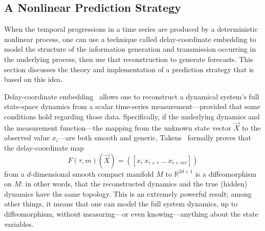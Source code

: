 \subsection{A Nonlinear Prediction Strategy}
\label{sec:lma}

When the temporal progressions in a time series are produced by a
deterministic nonlinear process, one can use a technique called
delay-coordinate embedding
%
%
to model the structure of the information generation and transmission
occurring in the underlying process, then use that reconstruction to
generate forecasts.  This section discusses the theory and
implementation of a prediction strategy that is based on this idea.

Delay-coordinate embedding~\cite{packard80,Sauer:1991lr,Takens:1981uq}
allows one to reconstruct a dynamical system's full state-space
dynamics from a scalar time-series measurement---provided that some
conditions hold regarding those data.  Specifically, if the underlying
dynamics and the measurement function---the mapping from the unknown
state vector $\vec{X}$ to the observed value $x_i$---are both smooth
and generic, Takens~\cite{Takens:1981uq} formally proves that the
delay-coordinate map
\[
F(\tau,m)(\vec{X}) = ([x_{i} ~ x_{i+\tau} ~ \dots ~x_{i+m\tau}])
\]
from a $d$-dimensional smooth compact manifold $M$ to
$\mathbb{R}^{2d+1}$ is a diffeomorphism on $M$: in other words, that
the reconstructed dynamics and the true (hidden) dynamics have the
same topology.  This is an extremely powerful result; among other
things, it means that one can model the full system dynamics, up to
diffeomorphism, without measuring---or even knowing---anything about
the state variables.


